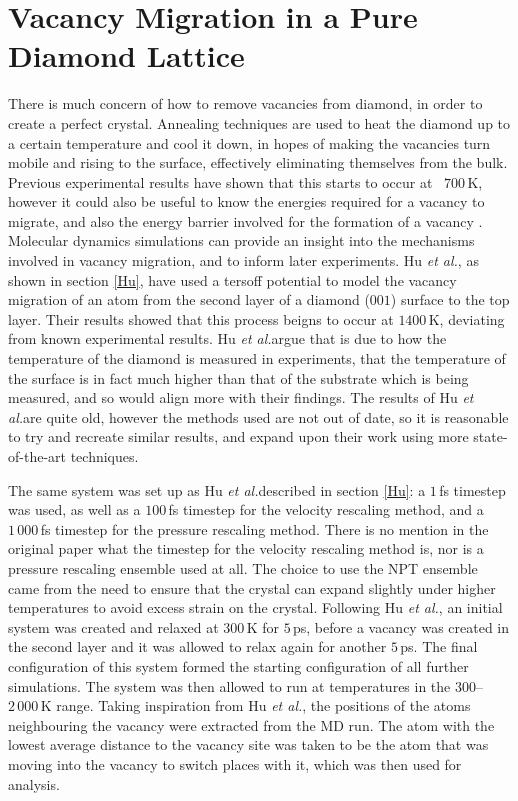 \documentclass[10pt,a4paper,twocolumn,twoside]{extarticle}
\newcommand{\al}{\emph{et al.}}
\begin{document}
\section{Vacancy Migration in a Pure Diamond Lattice}
\label{sec:vacancy}
There is much concern of how to remove vacancies from diamond, in order to create a perfect crystal. Annealing techniques are used to heat the diamond up to a certain temperature and cool it down, in hopes of making the vacancies turn mobile and rising to the surface, effectively eliminating themselves from the bulk. Previous experimental results have shown that this starts to occur at ~$700$\,K, however it could also be useful to know the energies required for a vacancy to migrate, and also the energy barrier involved for the formation of a vacancy \cite{VacancyTemp}. Molecular dynamics simulations can provide an insight into the mechanisms involved in vacancy migration, and to inform later experiments. Hu \al, as shown in section \ref{Hu}, have used a tersoff potential to model the vacancy migration of an atom from the second layer of a diamond ($001$) surface to the top layer. Their results showed that this process beigns to occur at $1400$\,K, deviating from known experimental results. Hu \al argue that is due to how the temperature of the diamond is measured in experiments, that the temperature of the surface is in fact much higher than that of the substrate which is being measured, and so would align more with their findings. The results of Hu \al are quite old, however the methods used are not out of date, so it is reasonable to try and recreate similar results, and expand upon their work using more state-of-the-art techniques. 

The same system was set up as Hu \al described in section \ref{Hu}: a $1$\,fs timestep was used, as well as a $100$\,fs timestep for the velocity rescaling method, and a $1\,000$\,fs timestep for the pressure rescaling method. There is no mention in the original paper what the timestep for the velocity rescaling method is, nor is a pressure rescaling ensemble used at all. The choice to use the NPT ensemble came from the need to ensure that the crystal can expand slightly under higher temperatures to avoid excess strain on the crystal. Following Hu \al, an initial system was created and relaxed at $300$\,K for $5$\,ps, before a vacancy was created in the second layer and it was allowed to relax again for another $5$\,ps. The final configuration of this system formed the starting configuration of all further simulations. The system was then allowed to run at temperatures in the $300$--$2\,000$\,K range. Taking inspiration from Hu \al, the positions of the atoms neighbouring the vacancy were extracted from the MD run. The atom with the lowest average distance to the vacancy site was taken to be the atom that was moving into the vacancy to switch places with it, which was then used for analysis. 
\end{document}
